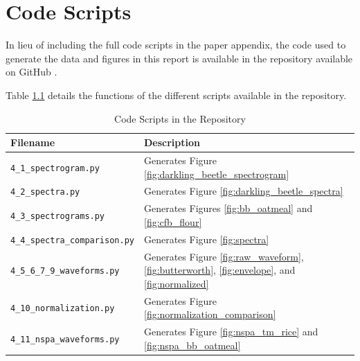 \documentclass[../Vibro-Acoustic Signatures and Detection Algorithms for Stored Product Insects.tex]{subfiles}
\begin{document}
\newpage

\chapter{Code Scripts}
\label{app:scripts}

In lieu of including the full code scripts in the paper appendix, the code used to generate the data and figures in this report is available in the repository available on GitHub \cite{danielkadyrovDkadyrovVibroAcousticSignaturesandDetectionAlgorithmsforStoredProductInsectsDOI2026}.

Table \ref{tab:files} details the functions of the different scripts available in the repository.

\begin{table}[!htbp]
  \caption{Code Scripts in the Repository\label{tab:files}}
  \centering
  \small
  \begin{tabular}{@{}ll@{}}
    \toprule
    \textbf{Filename}                             & \textbf{Description}                                                                                         \\
    \midrule
    \texttt{4\_1\_spectrogram.py}                 & Generates Figure \ref{fig:darkling_beetle_spectrogram}                                                       \\
    \texttt{4\_2\_spectra.py}                     & Generates Figure \ref{fig:darkling_beetle_spectra}                                                           \\
    \texttt{4\_3\_spectrograms.py}                & Generates Figures \ref{fig:bb_oatmeal} and \ref{fig:cfb_flour}                                               \\
    \texttt{4\_4\_spectra\_comparison.py}         & Generates Figure \ref{fig:spectra}                                                                           \\
    \texttt{4\_5\_6\_7\_9\_waveforms.py}          & Generates Figure \ref{fig:raw_waveform}, \ref{fig:butterworth}, \ref{fig:envelope}, and \ref{fig:normalized} \\
    \texttt{4\_10\_normalization.py}              & Generates Figure \ref{fig:normalization_comparison}                                                          \\
    \texttt{4\_11\_nspa\_waveforms.py}            & Generates Figure \ref{fig:nspa_tm_rice} and \ref{fig:nspa_bb_oatmeal}                                        \\

\end{tabular}
\end{table}
\end{document}
